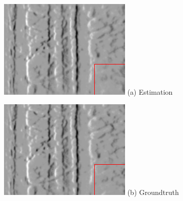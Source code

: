\begin{figure}
  \begin{minipage}[t]{0.48\textwidth}
    \centering \includegraphics[width =
    \textwidth]{images/slider_estimation.png}
    \label{subfig:estimation}
    (a) Estimation
  \end{minipage}
  \hfill
  \begin{minipage}[t]{0.48\textwidth}
    \centering \includegraphics[width =
    \textwidth]{images/slider_groundtruth.png}
    \label{subfig:groundtruth}
    (b) Groundtruth
  \end{minipage}
  \hfill


\end{figure}
